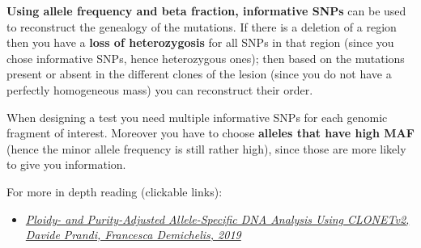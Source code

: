   \textbf{Using allele frequency and beta fraction, informative SNPs} can be
  used to reconstruct the genealogy of the mutations. If there is a deletion of
  a region then you have a \textbf{loss of heterozygosis} for all SNPs in that
  region (since you chose informative SNPs, hence heterozygous ones); then based
  on the mutations present or absent in the different clones of the lesion
  (since you do not have a perfectly homogeneous mass) you can reconstruct their
  order.  

  When designing a test you need multiple informative SNPs for each genomic
  fragment of interest. Moreover you have to choose \textbf{alleles that have
  high MAF} (hence the minor allele frequency is still rather high), since those
  are more likely to give you information. 

  For more in depth reading (clickable links):
  \begin{itemize}
    \item \href{https://pubmed.ncbi.nlm.nih.gov/31524989/}{\textit{Ploidy- and
    Purity-Adjusted Allele-Specific DNA Analysis Using CLONETv2, Davide Prandi,
    Francesca Demichelis, 2019}}
  \end{itemize}

